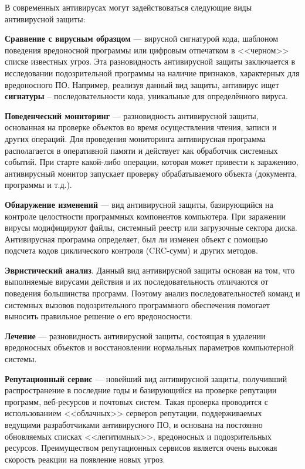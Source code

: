 \noindent В современных антивирусах могут задействоваться следующие виды
антивирусной защиты:

\textbf{Сравнение с вирусным образцом} --- вирусной сигнатурой кода, шаблоном
поведения вредоносной программы или цифровым отпечатком в <<черном>> списке
известных угроз. Эта разновидность антивирусной защиты заключается в
исследовании подозрительной программы на наличие признаков, характерных для
вредоносного ПО. Например, реализуя данный вид защиты, антивирус ищет
\textbf{сигнатуры} -- последовательности кода, уникальные для определённого
вируса.

\textbf{Поведенческий мониторинг} --- разновидность антивирусной защиты,
основанная на проверке объектов во время осуществления чтения, записи и
других операций. Для проведения мониторинга антивирусная программа
располагается в оперативной памяти и действует как обработчик системных
событий. При старте какой-либо операции, которая может привести к заражению,
антивирусный монитор запускает проверку обрабатываемого объекта (документа,
программы и т.д.).

\textbf{Обнаружение изменений} --- вид антивирусной защиты, базирующийся на
контроле целостности программных компонентов компьютера. При заражении вирусы
модифицируют файлы, системный реестр или загрузочные сектора диска.
Антивирусная программа определяет, был ли изменен объект с помощью подсчета
кодов циклического контроля (CRC-сумм) и других методов.

\textbf{Эвристический анализ}. Данный вид антивирусной защиты основан на том,
что выполняемые вирусами действия и их последовательность отличаются от
поведения большинства программ. Поэтому анализ последовательностей команд и
системных вызовов подозрительного программного обеспечения помогает выносить
правильное решение о его вредоносности.

\textbf{Лечение} --- разновидность антивирусной защиты, состоящая в удалении
вредоносных объектов и восстановлении нормальных параметров компьютерной
системы.

\textbf{Репутационный сервис} --- новейший вид антивирусной защиты,
получивший распространение в последние годы и базирующийся на проверке
репутации программ, веб-ресурсов и почтовых систем. Такая проверка проводится
с использованием <<облачных>> серверов репутации, поддерживаемых ведущими
разработчиками антивирусного ПО, и основана на постоянно обновляемых списках
<<легитимных>>, вредоносных и подозрительных ресурсов. Преимуществом
репутационных сервисов является очень высокая скорость реакции на появление
новых угроз.

